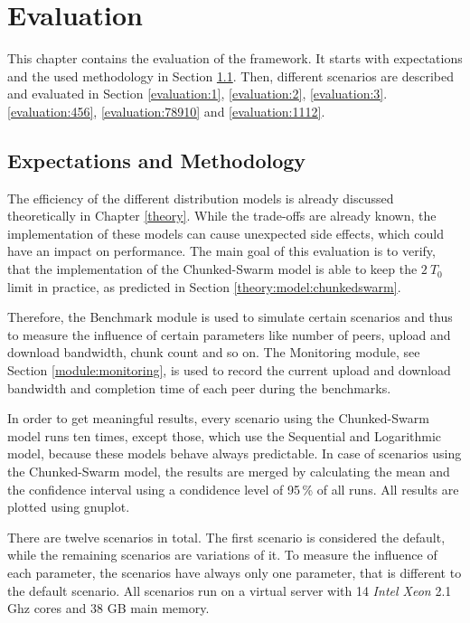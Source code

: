 
\chapter{Evaluation}
\label{evaluation}

This chapter contains the evaluation of the framework. It starts with expectations and the used methodology in Section \ref{evaluation:expectations}. Then, different scenarios are described and evaluated in Section \ref{evaluation:1}, \ref{evaluation:2}, \ref{evaluation:3}. \ref{evaluation:456}, \ref{evaluation:78910} and \ref{evaluation:1112}.

\section{Expectations and Methodology}
\label{evaluation:expectations}

The efficiency of the different distribution models is already discussed theoretically in Chapter \ref{theory}. While the trade-offs are already known, the implementation of these models can cause unexpected side effects, which could have an impact on performance. The main goal of this evaluation is to verify, that the implementation of the Chunked-Swarm model is able to keep the $2\:T_0$ limit in practice, as predicted in Section \ref{theory:model:chunkedswarm}.

Therefore, the Benchmark module is used to simulate certain scenarios and thus to measure the influence of certain parameters like number of peers, upload and download bandwidth, chunk count and so on. The Monitoring module, see Section \ref{module:monitoring}, is used to record the current upload and download bandwidth and completion time of each peer during the benchmarks.

In order to get meaningful results, every scenario using the Chunked-Swarm model runs ten times, except those, which use the Sequential and Logarithmic model, because these models behave always predictable. In case of scenarios using the Chunked-Swarm model, the results are merged by calculating the mean and the confidence interval using a condidence level of 95\,\% of all runs. All results are plotted using gnuplot.

There are twelve scenarios in total. The first scenario is considered the default, while the remaining scenarios are variations of it. To measure the influence of each parameter, the scenarios have always only one parameter, that is different to the default scenario. All scenarios run on a virtual server with 14 \emph{Intel Xeon} 2.1 Ghz cores and 38 GB main memory.

